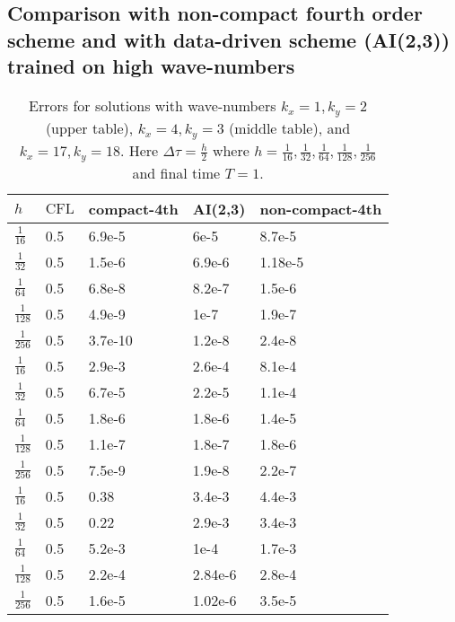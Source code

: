 \documentclass[12pt,reqno]{amsart}
\theoremstyle{definition}
\numberwithin{equation}{section}
\begin{document}
		\subsection{Comparison with non-compact fourth order scheme and with data-driven scheme (AI(2,3)) trained on high wave-numbers}
		\begin{table} [h!]
			\centering
			\begin{tabular}{|p{0.7cm}|p{0.7cm}|p{4cm}|p{4cm}|p{4cm}|}
				\hline
				$h$ & $\mathrm{CFL}$ &compact-4th& AI(2,3)&non-compact-4th
				\\ [0.5ex] 
				\hline 
				$\frac{1}{16}$ & 0.5& 6.9e-5&  6e-5&8.7e-5 \\[0.5mm]
				$\frac{1}{32}$ & 0.5 &1.5e-6 &6.9e-6&1.18e-5 \\[0.5mm]
				$\frac{1}{64}$ & 0.5 & 6.8e-8 &8.2e-7& 1.5e-6 \\[0.5mm]
				$\frac{1}{128}$ & 0.5 &4.9e-9 & 1e-7&1.9e-7 \\[0.5mm]
				$\frac{1}{256}$ & 0.5& 3.7e-10 &1.2e-8&2.4e-8 \\[0.5mm]
				\hline \hline
				$\frac{1}{16}$ & 0.5& 2.9e-3&  2.6e-4&8.1e-4 \\[0.5mm]
				$\frac{1}{32}$ & 0.5 &6.7e-5 &2.2e-5&1.1e-4 \\[0.5mm]
				$\frac{1}{64}$ & 0.5 & 1.8e-6 &1.8e-6& 1.4e-5 \\[0.5mm]
				$\frac{1}{128}$ & 0.5 &1.1e-7 & 1.8e-7&1.8e-6 \\[0.5mm]
				$\frac{1}{256}$ & 0.5& 7.5e-9 &1.9e-8&2.2e-7 \\[0.5mm]
				\hline \hline
				$\frac{1}{16}$ & 0.5& 0.38& 3.4e-3 &4.4e-3\\[0.5mm]
				$\frac{1}{32}$ & 0.5 &0.22 &2.9e-3&3.4e-3 \\[0.5mm]
				$\frac{1}{64}$ & 0.5 & 5.2e-3 &1e-4& 1.7e-3\\[0.5mm]
				$\frac{1}{128}$ & 0.5 &2.2e-4 & 2.84e-6&2.8e-4\\[0.5mm]
				$\frac{1}{256}$ & 0.5& 1.6e-5 &1.02e-6& 3.5e-5\\[0.5mm]
				\hline
			\end{tabular}
			\caption{ Errors for solutions  with wave-numbers $k_x=1,k_y=2$ (upper table), $k_x=4,k_y=3$ (middle table),
				and  $k_x=17,k_y=18$.
				Here $\Delta \tau=\frac{h}{2}$ where $h=\frac{1}{16},\frac{1}{32},\frac{1}{64},
				\frac{1}{128}, \frac{1}{256}
				$
				and final time $T=1$.}
			\label{table:conv_rates_3}
		\end{table}
\end{document}
